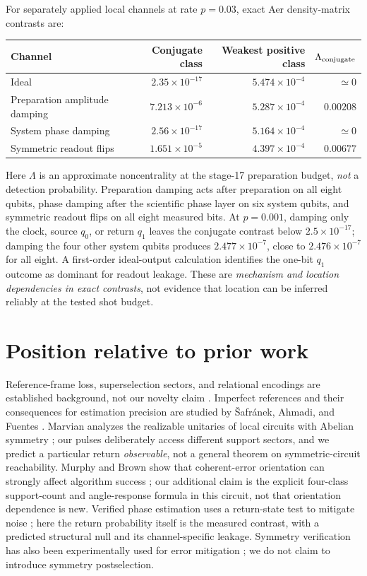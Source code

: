 \documentclass[11pt,a4paper]{article}
\begin{document}
For separately applied local channels at rate $p=0.03$, exact Aer density-matrix contrasts are:
\begin{center}
\small
\begin{tabular}{@{}l r r r@{}}
\toprule
Channel & Conjugate class & Weakest positive class & $\Lambda_{\rm conjugate}$\\
\midrule
Ideal & $2.35\times10^{-17}$ & $5.474\times10^{-4}$ & $\simeq0$\\
Preparation amplitude damping & $7.213\times10^{-6}$ & $5.287\times10^{-4}$ & $0.00208$\\
System phase damping & $2.56\times10^{-17}$ & $5.164\times10^{-4}$ & $\simeq0$\\
Symmetric readout flips & $1.651\times10^{-5}$ & $4.397\times10^{-4}$ & $0.00677$\\
\bottomrule
\end{tabular}
\end{center}
Here $\Lambda$ is an approximate noncentrality at the stage-17 preparation budget, \emph{not} a detection probability. Preparation damping acts after preparation on all eight qubits, phase damping after the scientific phase layer on six system qubits, and symmetric readout flips on all eight measured bits. At $p=0.001$, damping only the clock, source $q_0$, or return $q_1$ leaves the conjugate contrast below $2.5\times10^{-17}$; damping the four other system qubits produces $2.477\times10^{-7}$, close to $2.476\times10^{-7}$ for all eight. A first-order ideal-output calculation identifies the one-bit $q_1$ outcome as dominant for readout leakage. These are \emph{mechanism and location dependencies in exact contrasts}, not evidence that location can be inferred reliably at the tested shot budget.

\section*{Position relative to prior work}
Reference-frame loss, superselection sectors, and relational encodings are established background, not our novelty claim \cite{bartlett}. Imperfect references and their consequences for estimation precision are studied by \v{S}afr\'anek, Ahmadi, and Fuentes \cite{safranek}. Marvian analyzes the realizable unitaries of local circuits with Abelian symmetry \cite{marvian}; our pulses deliberately access different support sectors, and we predict a particular return \emph{observable}, not a general theorem on symmetric-circuit reachability. Murphy and Brown show that coherent-error orientation can strongly affect algorithm success \cite{murphy}; our additional claim is the explicit four-class support-count and angle-response formula in this circuit, not that orientation dependence is new. Verified phase estimation uses a return-state test to mitigate noise \cite{obrien}; here the return probability itself is the measured contrast, with a predicted structural null and its channel-specific leakage. Symmetry verification has also been experimentally used for error mitigation \cite{sagastizabal}; we do not claim to introduce symmetry postselection.
\end{document}
